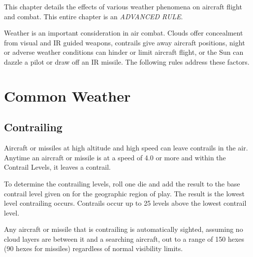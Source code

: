 

\label{rule:night-and-weather}

This chapter details the effects of various weather phenomena on aircraft flight and combat. This entire chapter is an \emph{ADVANCED RULE}.

\begin{advancedrules}

    Weather is an important consideration in air combat. Clouds offer concealment from visual and IR guided weapons, contrails give away aircraft positions, night or adverse weather conditions can hinder or limit aircraft flight, or the Sun can dazzle a pilot or draw off an IR missile. The following rules address these factors.


    \section{Common Weather}

    \label{rule:clouds}
    \label{rule:haze}
    \label{rule:stratus-clouds}
    \label{rule:dense-clouds}

    \subsection{Contrailing} Aircraft or missiles at high altitude and high speed can leave contrails in the air. Anytime an aircraft or missile is at a speed of 4.0 or more and within the Contrail Levels, it leaves a contrail.

    To determine the contrailing levels, roll one die and add the result to the base contrail level given on  for the geographic region of play. The result is the lowest level contrailing occurs. Contrails occur up to 25 levels above the lowest contrail level.

    Any aircraft or missile that is contrailing is automatically sighted, assuming no cloud layers are between it and a searching aircraft, out to a range of 150 hexes (90 hexes for missiles) regardless of normal visibility limits.

\end{advancedrules}
